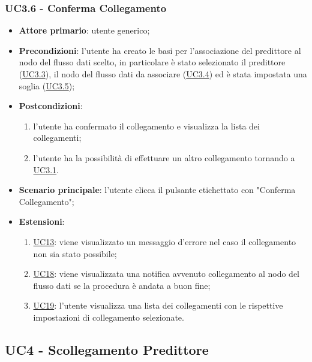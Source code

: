 	\subsubsection{UC3.6 - Conferma Collegamento}
		\begin{itemize}
			\item\textbf{Attore primario}: utente generico;
			\item\textbf{Precondizioni}: l’utente ha creato le basi per l'associazione del predittore al nodo del flusso dati scelto, in particolare è stato selezionato il predittore (\hyperref[par:UC3.3]{UC3.3}), il nodo del flusso dati da associare (\hyperref[par:UC3.4]{UC3.4}) ed è stata impostata una soglia (\hyperref[par:UC3.5]{UC3.5});
			\item\textbf{Postcondizioni}:
				\begin{enumerate}
					\item l’utente ha confermato il collegamento e visualizza la lista dei collegamenti;
					\item l'utente ha la possibilità di effettuare un altro collegamento tornando a \hyperref[par:UC3.1]{UC3.1}.
				\end{enumerate}
			\item\textbf{Scenario principale}: l’utente clicca il pulsante etichettato con "Conferma Collegamento";
			\item\textbf{Estensioni}: 
				\begin{enumerate}
					\item\hyperref[par:UC13]{UC13}: viene visualizzato un messaggio d’errore nel caso il collegamento non sia stato possibile;
					\item\hyperref[par:UC18]{UC18}: viene visualizzata una notifica avvenuto collegamento al nodo del flusso dati se la procedura è andata a buon fine;
					\item\hyperref[par:UC19]{UC19}: l'utente visualizza una lista dei collegamenti con le rispettive impostazioni di collegamento selezionate.		
				\end{enumerate}
		\end{itemize}

	

	\label{par:UC4}
	\subsection{UC4 - Scollegamento Predittore}

